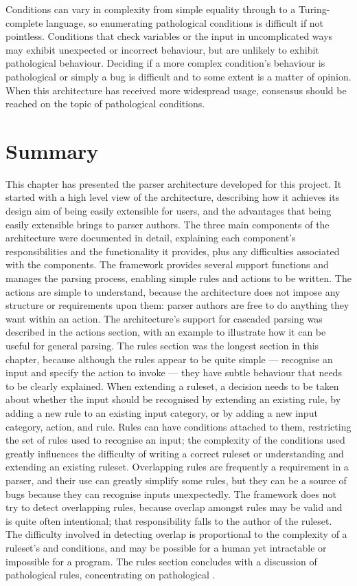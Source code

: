 Conditions can vary in complexity from simple equality through to a
Turing-complete language, so enumerating pathological conditions is
difficult if not pointless.  Conditions that check variables or the input
in uncomplicated ways may exhibit unexpected or incorrect behaviour, but
are unlikely to exhibit pathological behaviour.  Deciding if a more complex
condition's behaviour is pathological or simply a bug is difficult and to
some extent is a matter of opinion.  When this architecture has received
more widespread usage, consensus should be reached on the topic of
pathological conditions.

\section{Summary}

This chapter has presented the parser architecture developed for this
project.  It started with a high level view of the architecture, describing
how it achieves its design aim of being easily extensible for users, and
the advantages that being easily extensible brings to parser authors.  The
three main components of the architecture were documented in detail,
explaining each component's responsibilities and the functionality it
provides, plus any difficulties associated with the components.  The
framework provides several support functions and manages the parsing
process, enabling simple rules and actions to be written.  The actions are
simple to understand, because the architecture does not impose any
structure or requirements upon them: parser authors are free to do anything
they want within an action.  The architecture's support for cascaded
parsing was described in the actions section, with an example to illustrate
how it can be useful for general parsing.  The rules section was the
longest section in this chapter, because although the rules appear to be
quite simple --- recognise an input and specify the action to invoke ---
they have subtle behaviour that needs to be clearly explained.  When
extending a ruleset, a decision needs to be taken about whether the input
should be recognised by extending an existing rule, by adding a new rule to
an existing input category, or by adding a new input category, action, and
rule.  Rules can have conditions attached to them, restricting the set of
rules used to recognise an input; the complexity of the conditions used
greatly influences the difficulty of writing a correct ruleset or
understanding and extending an existing ruleset.  Overlapping rules are
frequently a requirement in a parser, and their use can greatly simplify
some rules, but they can be a source of bugs because they can recognise
inputs unexpectedly.  The framework does not try to detect overlapping
rules, because overlap amongst rules may be valid and is quite often
intentional; that responsibility falls to the author of the ruleset.  The
difficulty involved in detecting overlap is proportional to the complexity
of a ruleset's \regexes{} and conditions, and may be possible for a human
yet intractable or impossible for a program.  The rules section concludes
with a discussion of pathological rules, concentrating on pathological
\regexes{}.
